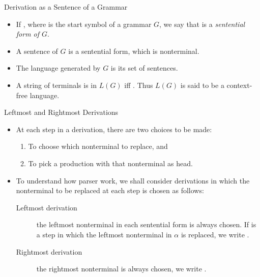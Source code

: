 \begin{bibunit}[apalike]
\begin{frame}{Derivation as a Sentence of a Grammar}
	\begin{itemize}
	\item If , where  is the start symbol of a grammar $G$, we say that  is a \emph{sentential form of $G$}.
	\vfill
	\item A sentence of $G$ is a sentential form, which is nonterminal.
	\vfill
	\item The language generated by $G$ is its set of sentences.
	\vfill
	\item A string of terminals  is in $L(G)$ iff . Thus $L(G)$ is said to be a context-free language.
	\end{itemize}
\end{frame}

\begin{frame}{Leftmost and Rightmost Derivations}
	\begin{itemize}
	\item At each step in a derivation, there are two choices to be made:
		\begin{enumerate}
		\item To choose which nonterminal to replace, and
		\item To pick a production with that nonterminal as head.
		\end{enumerate}
	\vfill
	\item To understand how parser work, we shall consider derivations in which the nonterminal to be replaced at each step is chosen as follows: \begin{description}
		\item[Leftmost derivation] the leftmost nonterminal in each sentential form is always chosen. If \bnftext{$\alpha$\deriv$\beta$} is a step in which the leftmost nonterminal in $\alpha$ is replaced, we write \bnftext{$\alpha$\derivlm$\beta$}.
		\item[Rightmost derivation] the rightmost nonterminal is always chosen, we write \bnftext{$\alpha$\derivrm$\beta$}.
		\end{description}
	\end{itemize}
\end{frame}


\end{bibunit}
